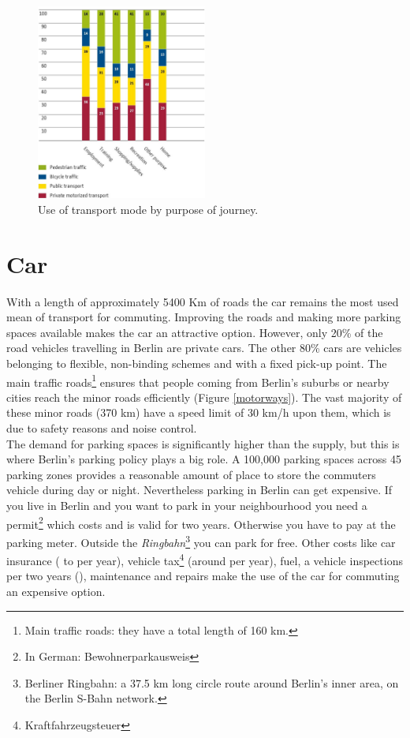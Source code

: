 \begin{figure}[h]
	\includegraphics[width=0.5\textwidth]{MobilityInTheCityJPG/Graphs/UseOfTransportPurpose.jpg}
	\centering
	\caption{Use of transport mode by purpose of journey.\cite{MobilityCity}}
\end{figure}
\section{Car}

With a length of approximately 5400 Km of roads the car remains the most used mean of transport for commuting. Improving the roads and making more parking spaces available makes the car an attractive option. However, only 20\% of the road vehicles travelling in Berlin are private cars. The other 80\% cars are vehicles belonging to flexible, non-binding schemes and with a fixed pick-up point.  The main traffic roads\footnote{Main traffic roads: they have a total length of 160 km.} ensures that people coming from Berlin's suburbs or nearby cities reach the minor roads efficiently (Figure \ref{motorways}). The vast majority of these minor roads (370 km) have a speed limit of 30 km/h upon them, which is due to safety reasons and noise control\cite{MobilityCity}. \\ \newline
The demand for parking spaces is significantly higher than the supply, but this is where Berlin's parking policy plays a big role. A 100,000 parking spaces across 45 parking zones provides a reasonable amount of place to store the commuters vehicle during day or night. Nevertheless parking in Berlin can get expensive. If you live in Berlin and you want to park in your neighbourhood you need a permit\footnote{In German: Bewohnerparkausweis} which costs  and is valid for two years. Otherwise you have to pay at the parking meter. Outside the \textit{Ringbahn}\footnote{Berliner Ringbahn: a 37.5 km long circle route around Berlin's inner area, on the Berlin S-Bahn network.} you can park for free. Other costs like car insurance ( to  per year), vehicle tax\footnote{Kraftfahrzeugsteuer} (around  per year), fuel, a vehicle inspections per two years (), maintenance and repairs make the use of the car for commuting an expensive option\cite{CostCars}.

